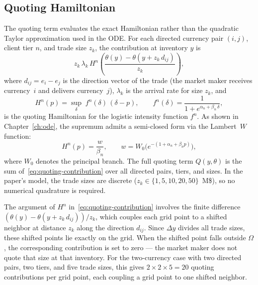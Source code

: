\subsection{Quoting Hamiltonian}
\label{sec:pde-quoting}

The quoting term evaluates the exact Hamiltonian rather than the quadratic Taylor approximation used in the ODE. For each directed currency pair $(i,j)$, client tier $n$, and trade size $z_k$, the contribution at inventory $y$ is
\begin{equation}
  \label{eq:quoting-contribution}
  z_k\,\lambda_k\,H^n\!\left(\frac{\theta(y) - \theta(y + z_k\,d_{ij})}{z_k}\right),
\end{equation}
where $d_{ij} = e_i - e_j$ is the direction vector of the trade (the market maker receives currency~$i$ and delivers currency~$j$), $\lambda_k$ is the arrival rate for size $z_k$, and
\begin{equation}
  \label{eq:H-exact}
  H^n(p) = \sup_\delta\; f^n(\delta)\,(\delta - p), \qquad f^n(\delta) = \frac{1}{1 + e^{\alpha_n + \beta_n\,\delta}},
\end{equation}
is the quoting Hamiltonian for the logistic intensity function $f^n$. As shown in Chapter~\ref{ch:ode}, the supremum admits a semi-closed form via the Lambert~$W$ function:
\begin{equation}
  \label{eq:H-lambert}
  H^n(p) = \frac{w}{\beta_n}, \qquad w = W_0\!\bigl(e^{-(1 + \alpha_n + \beta_n p)}\bigr),
\end{equation}
where $W_0$ denotes the principal branch. The full quoting term $Q(y, \theta)$ is the sum of~\eqref{eq:quoting-contribution} over all directed pairs, tiers, and sizes. In the paper's model, the trade sizes are discrete ($z_k \in \{1, 5, 10, 20, 50\}$~M\$), so no numerical quadrature is required.

The argument of $H^n$ in~\eqref{eq:quoting-contribution} involves the finite difference $(\theta(y) - \theta(y + z_k\,d_{ij}))/z_k$, which couples each grid point to a shifted neighbor at distance $z_k$ along the direction $d_{ij}$. Since $\Delta y$ divides all trade sizes, these shifted points lie exactly on the grid. When the shifted point falls outside $\Omega$, the corresponding contribution is set to zero — the market maker does not quote that size at that inventory. For the two-currency case with two directed pairs, two tiers, and five trade sizes, this gives $2 \times 2 \times 5 = 20$ quoting contributions per grid point, each coupling a grid point to one shifted neighbor.



